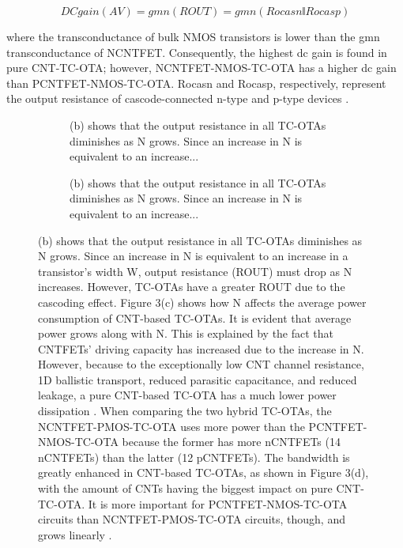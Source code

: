 \begin{equation}
  DC gain (AV) = gmn (ROUT) = gmn (RocasnǁRocasp)
  \label{eq:8}
\end{equation}

where the transconductance of bulk NMOS transistors is lower than the gmn
transconductance of NCNTFET. Consequently, the highest dc gain is found in pure
CNT-TC-OTA; however, NCNTFET-NMOS-TC-OTA has a higher dc gain than
PCNTFET-NMOS-TC-OTA. Rocasn and Rocasp, respectively, represent the output
resistance of cascode-connected n-type and p-type devices \cite{ref1}.

\begin{figure}[htbp]
  \centering
  \begin{subfigure}[b]{0.48\linewidth}
    \centering
    \caption{(b) shows that the output resistance in all TC-OTAs diminishes as N grows. Since an increase in N is equivalent to an increase...}

  \end{subfigure}
  \hfill
  \begin{subfigure}[b]{0.48\linewidth}
    \centering
    \caption{(b) shows that the output resistance in all TC-OTAs diminishes as N grows. Since an increase in N is equivalent to an increase...}

  \end{subfigure}
  \caption{(b) shows that the output resistance in all TC-OTAs diminishes as N grows. Since an increase in N is equivalent to an increase in a transistor's width W, output resistance (ROUT) must drop as N increases. However, TC-OTAs have a greater ROUT due to the cascoding effect. Figure 3(c) shows how N affects the average power consumption of CNT-based TC-OTAs. It is evident that average power grows along with N. This is explained by the fact that CNTFETs' driving capacity has increased due to the increase in N. However, because to the exceptionally low CNT channel resistance, 1D ballistic transport, reduced parasitic capacitance, and reduced leakage, a pure CNT-based TC-OTA has a much lower power dissipation \cite{ref18,ref35}. When comparing the two hybrid TC-OTAs, the NCNTFET-PMOS-TC-OTA uses more power than the PCNTFET-NMOS-TC-OTA because the former has more nCNTFETs (14 nCNTFETs) than the latter (12 pCNTFETs). The bandwidth is greatly enhanced in CNT-based TC-OTAs, as shown in Figure 3(d), with the amount of CNTs having the biggest impact on pure CNT-TC-OTA. It is more important for PCNTFET-NMOS-TC-OTA circuits than NCNTFET-PMOS-TC-OTA circuits, though, and grows linearly \cite{ref6,ref19}.}

  \label{fig:group_ab5t3}
\end{figure}

